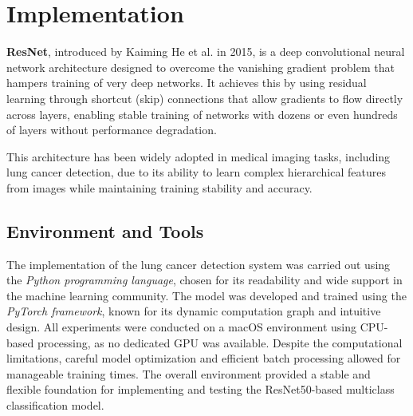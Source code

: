 
\section{Implementation}

\textbf{ResNet}, introduced by Kaiming He et al. in 2015, is a deep convolutional neural network 
architecture designed to overcome the vanishing gradient problem that hampers training of very deep 
networks. It achieves this by using residual learning through shortcut (skip) connections that 
allow gradients to flow directly across layers, enabling stable training of networks with dozens or 
even hundreds of layers without performance degradation. \cite{gb2023}

This architecture has been widely adopted in medical imaging tasks, including lung cancer detection, 
due to its ability to learn complex hierarchical features from images while maintaining training 
stability and accuracy. \cite{jptcp2023}


\subsection{Environment and Tools}
The implementation of the lung cancer detection system was carried out using the \textit{Python 
programming language}, chosen for its readability and wide support in the machine learning 
community. The model was developed and trained using the \textit{PyTorch framework}, known for its 
dynamic computation graph and intuitive design. All experiments were conducted on a macOS 
environment using CPU-based processing, as no dedicated GPU was available. Despite the computational 
limitations, careful model optimization and efficient batch processing allowed for manageable 
training times. The overall environment provided a stable and flexible foundation for implementing 
and testing the ResNet50-based multiclass classification model.

